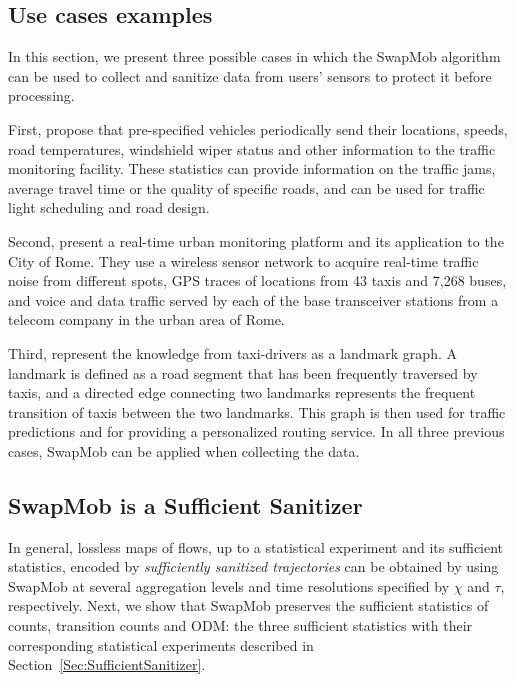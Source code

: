 \documentclass[times,twocolumn,final,authoryear]{elsarticle}
\begin{document}
\subsection{Use cases examples}
In this section, we present three possible cases in which the SwapMob algorithm can be used to collect and sanitize data
from users' sensors to protect it before processing.

First,
\cite{Hoh2005} propose that pre-specified vehicles periodically send their locations, speeds, road temperatures, windshield wiper status and other information to the traffic monitoring facility. These statistics can provide information on the traffic jams, average travel time or the quality of specific roads, and can be used for traffic light scheduling and road design.

Second, \cite{Calabrese2011} present a real-time urban monitoring platform and its application to the City of Rome. They use a wireless sensor network to acquire real-time traffic noise from different spots, GPS traces of locations from 43 taxis and 7,268 buses, and voice and data traffic served by each of the base transceiver stations from a telecom company in the urban area of Rome. 


Third, \cite{Yuan2011} represent the knowledge from taxi-drivers as a landmark graph. 
A landmark is defined as a road segment that has been frequently traversed by taxis, and a directed edge connecting two landmarks represents the frequent transition of taxis between the two landmarks. This graph is then used for traffic predictions and for providing a personalized routing service.
In all three previous cases, SwapMob can be applied when collecting the data.

\subsection{SwapMob is a Sufficient Sanitizer}\label{sec:sufficient}
In general, lossless maps of flows, up to a statistical experiment and its sufficient statistics, encoded by {\em sufficiently sanitized trajectories} can be obtained by using SwapMob at several aggregation levels and time resolutions specified by $\chi$ and $\tau$, respectively.  
Next, we show that SwapMob preserves the sufficient statistics of counts, transition counts and ODM: the three sufficient statistics with their corresponding statistical experiments described in Section~\ref{Sec:SufficientSanitizer}.
\end{document}
